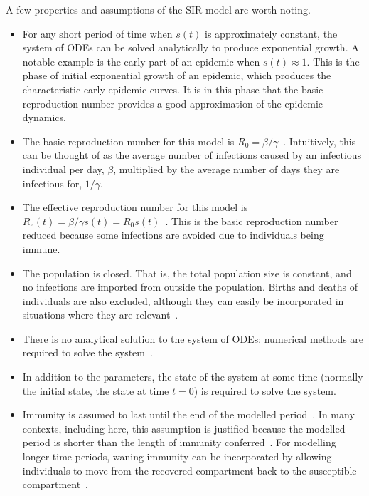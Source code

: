 \documentclass[thesis.tex]{subfiles}
\begin{document}

A few properties and assumptions of the SIR model are worth noting.
\begin{itemize}
    \item For any short period of time when $s(t)$ is approximately constant, the system of ODEs can be solved analytically to produce exponential growth.
    A notable example is the early part of an epidemic when $s(t) \approx 1$.
    This is the phase of initial exponential growth of an epidemic, which produces the characteristic early epidemic curves.
    It is in this phase that the basic reproduction number provides a good approximation of the epidemic dynamics.
    \item The basic reproduction number for this model is $R_0 = \beta / \gamma$~\autocite[20]{keelingModeling}.
    Intuitively, this can be thought of as the average number of infections caused by an infectious individual per day, $\beta$, multiplied by the average number of days they are infectious for, $1/\gamma$.
    \item The effective reproduction number for this model is $R_e(t) = \beta / \gamma s(t) = R_0 s(t)$~\autocite{pellisEstimation}.
    This is the basic reproduction number reduced because some infections are avoided due to individuals being immune.
    \item The population is closed.
    That is, the total population size is constant, and no infections are imported from outside the population.
    Births and deaths of individuals are also excluded, although they can easily be incorporated in situations where they are relevant~\autocites[26]{keelingModeling}[214]{kretzschmarMathematical}.
    \item There is no analytical solution to the system of ODEs: numerical methods are required to solve the system~\autocite[25]{keelingModeling}.
    \item In addition to the parameters, the state of the system at some time (normally the initial state, the state at time $t=0$) is required to solve the system.
    \item Immunity is assumed to last until the end of the modelled period~\autocite[61]{andersonInfectious}.
    In many contexts, including here, this assumption is justified because the modelled period is shorter than the length of immunity conferred~\autocite{milneImmunity}.
    For modelling longer time periods, waning immunity can be incorporated by allowing individuals to move from the recovered compartment back to the susceptible compartment~\autocite[40]{keelingModeling}.
\end{itemize}
\end{document}

